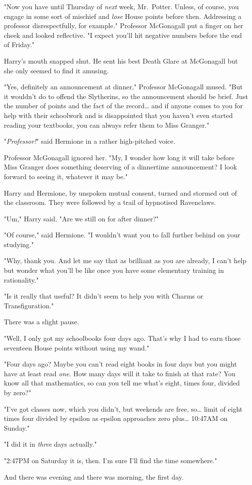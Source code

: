 "Now you have until Thursday of \emph{next} week, Mr.~Potter. Unless, of 
course, you engage in some sort of mischief and \emph{lose} House points before 
then. Addressing a professor disrespectfully, for example." Professor 
McGonagall put a finger on her cheek and looked reflective. "I expect you'll 
hit negative numbers before the end of Friday."

Harry's mouth snapped shut. He sent his best Death Glare at McGonagall but she 
only seemed to find it amusing.

"Yes, definitely an announcement at dinner," Professor McGonagall mused. "But 
it wouldn't do to offend the Slytherins, so the announcement should be brief. 
Just the number of points and the fact of the record{\ldots} and if anyone 
comes to you for help with their schoolwork and is disappointed that you 
haven't even started reading your textbooks, you can always refer them to Miss 
Granger."

"\emph{Professor!}" said Hermione in a rather high-pitched voice.

Professor McGonagall ignored her. "My, I wonder how long it will take before 
Miss Granger does something deserving of a dinnertime announcement? I look 
forward to seeing it, whatever it may be."

Harry and Hermione, by unspoken mutual consent, turned and stormed out of the 
classroom. They were followed by a trail of hypnotised Ravenclaws.

"Um," Harry said. "Are we still on for after dinner?"

"Of course," said Hermione. "I wouldn't want you to fall further behind on your 
studying."

"Why, thank you. And let me say that as brilliant as you are already, I can't 
help but wonder what you'll be like once you have some elementary training in 
rationality."

"Is it really that useful? It didn't seem to help you with Charms or 
Transfiguration."

There was a slight pause.

"Well, I only got my schoolbooks four days ago. That's why I had to earn those 
seventeen House points without using my wand."

"Four days ago? Maybe you can't read eight books in four days but you might 
have at least read \emph{one}. How many days will it take to finish at that 
rate? You know all that mathematics, so can you tell me what's eight, times 
four, divided by zero?"

"I've got classes now, which you didn't, but weekends are free, so{\ldots} 
limit of eight times four divided by epsilon as epsilon approaches zero 
plus{\ldots} 10:47AM on Sunday."

"I did it in \emph{three} days actually."

"2:47PM on Saturday it is, then. I'm sure I'll find the time somewhere."

And there was evening and there was morning, the first day.
